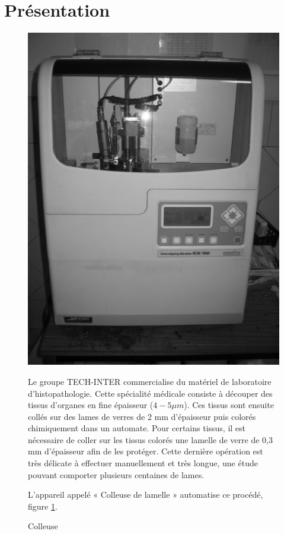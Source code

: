 

\section{Présentation}

\begin{figure}[!h]
  \begin{minipage}{0.35\linewidth}
  \centering\includegraphics[width=0.8\linewidth]{img/colleuse.png}
  \caption{Colleuse}
  \label{img1}
  \end{minipage}
  \hfill
  \begin{minipage}{0.60\linewidth}
  Le groupe TECH-INTER commercialise du matériel de laboratoire d'histopathologie. Cette spécialité médicale consiste à découper des tissus d'organes en fine épaisseur ($4-5 \mu m$). Ces tissus sont ensuite collés sur des lames de verres de 2 mm d'épaisseur puis colorés chimiquement dans un automate. Pour certains tissus, il est nécessaire de coller sur les tissus colorés une lamelle de verre de 0,3 mm d'épaisseur afin de les protéger. Cette dernière opération est très délicate à effectuer manuellement et très longue, une étude pouvant comporter plusieurs centaines de lames.

  L'appareil appelé « Colleuse de lamelle » automatise ce procédé, figure \ref{img1}.
\end{minipage}
\end{figure}


